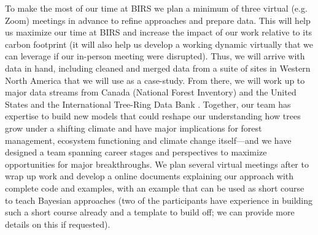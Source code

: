 \documentclass[11pt]{article}
\begin{document}
To make the most of our time at BIRS we plan a minimum of three virtual (e.g. Zoom) meetings in advance to refine approaches and prepare data. This will help us maximize our time at BIRS and increase the impact of our work relative to its carbon footprint (it will also help us develop a working dynamic virtually that we can leverage if our in-person meeting were disrupted). Thus, we will arrive with data in hand, including cleaned and merged data from a suite of sites in Western North America that we will use as a case-study. From there, we will work up to major data streams from Canada (National Forest Inventory) and the United States \citep[Forest Inventory and Analysis,][]{tinkham2018applications} and the International Tree-Ring Data Bank \citep{zhao2019international}. Together, our team has expertise to build new models that could reshape our understanding how trees grow under a shifting climate and have major implications for forest management, ecosystem functioning and climate change itself---and we have designed a team spanning career stages and perspectives to maximize opportunities for major breakthroughs. We plan several virtual meetings after to wrap up work and develop a online documents explaining our approach with complete code and examples, with an example that can be used as short course to teach Bayesian approaches (two of the participants have experience in building such a short course already and a template to build off; we can provide more details on this if requested).  



\end{document}
